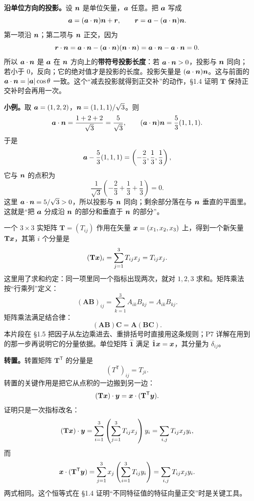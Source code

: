 \documentclass[11pt]{ctexart}
\newcommand{\ten}[1]{\mathbf{#1}}
\newcommand{\unitd}{\hat{\ten{1}}}
\let\origsubhdr\subhdr
\renewcommand{\subhdr}[1]{\par\needspace{3\baselineskip}\origsubhdr{#1}}
\begin{document}
\textbf{沿单位方向的投影。}设 $\boldsymbol{n}$ 是单位矢量，$\boldsymbol{a}$ 任意。把 $\boldsymbol{a}$ 写成
\[
\boldsymbol{a}=(\boldsymbol{a}\cdot\boldsymbol{n})\boldsymbol{n}+\boldsymbol{r},
\qquad
\boldsymbol{r}=\boldsymbol{a}-(\boldsymbol{a}\cdot\boldsymbol{n})\boldsymbol{n} .
\]
第一项沿 $\boldsymbol{n}$；第二项与 $\boldsymbol{n}$ 正交，因为
\[
\boldsymbol{r}\cdot\boldsymbol{n}
=\boldsymbol{a}\cdot\boldsymbol{n}-(\boldsymbol{a}\cdot\boldsymbol{n})(\boldsymbol{n}\cdot\boldsymbol{n})
=\boldsymbol{a}\cdot\boldsymbol{n}-\boldsymbol{a}\cdot\boldsymbol{n}=0 .
\]
所以 $\boldsymbol{a}\cdot\boldsymbol{n}$ 是 $\boldsymbol{a}$ 在 $\boldsymbol{n}$ 方向上的\textbf{带符号投影长度}：若 $\boldsymbol{a}\cdot\boldsymbol{n}>0$，投影与 $\boldsymbol{n}$ 同向；若小于 $0$，反向；它的绝对值才是投影的长度。投影矢量是 $(\boldsymbol{a}\cdot\boldsymbol{n})\boldsymbol{n}$。这与前面的 $\boldsymbol{a}\cdot\boldsymbol{n}=|\boldsymbol{a}|\cos\theta$ 一致。这个“减去投影就得到正交补”的动作，§1.4 证明 $\ten T$ 保持正交补时会再用一次。

\textbf{小例。}取 $\boldsymbol{a}=(1,2,2)$，$\boldsymbol{n}=(1,1,1)/\sqrt3$。则
\[
\boldsymbol{a}\cdot\boldsymbol{n}=\frac{1+2+2}{\sqrt3}=\frac{5}{\sqrt3},
\qquad
(\boldsymbol{a}\cdot\boldsymbol{n})\boldsymbol{n}=\frac53(1,1,1).
\]
于是
\[
\boldsymbol{a}-\frac53(1,1,1)=\left(-\frac23,\frac13,\frac13\right),
\]
它与 $\boldsymbol{n}$ 的点积为
\[
\frac{1}{\sqrt3}\left(-\frac23+\frac13+\frac13\right)=0 .
\]
这里 $\boldsymbol{a}\cdot\boldsymbol{n}=5/\sqrt3>0$，所以投影与 $\boldsymbol{n}$ 同向；剩余部分落在与 $\boldsymbol{n}$ 垂直的平面里。这就是“把 $\boldsymbol{a}$ 分成沿 $\boldsymbol{n}$ 的部分和垂直于 $\boldsymbol{n}$ 的部分”。


一个 $3\times3$ 实矩阵 $\ten T=(T_{ij})$ 作用在矢量 $\boldsymbol{x}=(x_1,x_2,x_3)$ 上，得到一个新矢量 $\ten T\vect x$，其第 $i$ 个分量是
\[
(\ten T\vect x)_i=\sum_{j=1}^{3}T_{ij}x_j=T_{ij}x_j .
\]
这里用了求和约定：同一项里同一个指标出现两次，就对 $1,2,3$ 求和。矩阵乘法按“行乘列”定义：
\[
(\ten A\ten B)_{ij}=\sum_{k=1}^{3}A_{ik}B_{kj}=A_{ik}B_{kj}.
\]
矩阵乘法满足结合律：
\[
(\ten A\ten B)\ten C=\ten A(\ten B\ten C).
\]
本片段在 §1.5 把因子从左边乘进去、重排括号时直接用这条规则；P7 详解在用到的那一步再说明它的分量依据。单位矩阵 $\unitd$ 满足 $\unitd\vect x=\vect x$，其分量为 $\delta_{ij}$。

\textbf{转置。}转置矩阵 $\ten T^{\mathsf T}$ 的分量是
\[
(T^{\mathsf T})_{ij}=T_{ji}.
\]
转置的关键作用是把它从点积的一边搬到另一边：
\[
(\ten T\vect x)\cdot\vect y=\vect x\cdot(\ten T^{\mathsf T}\vect y).
\]
证明只是一次指标改名：
\[
(\ten T\vect x)\cdot\vect y
=\sum_{i=1}^{3}\left(\sum_{j=1}^{3}T_{ij}x_j\right)y_i
=\sum_{i,j}T_{ij}x_jy_i,
\]
而
\[
\vect x\cdot(\ten T^{\mathsf T}\vect y)
=\sum_{j=1}^{3}x_j\left(\sum_{i=1}^{3}T_{ij}y_i\right)
=\sum_{i,j}T_{ij}x_jy_i .
\]
两式相同。这个恒等式在 §1.4 证明“不同特征值的特征向量正交”时是关键工具。
\end{document}
